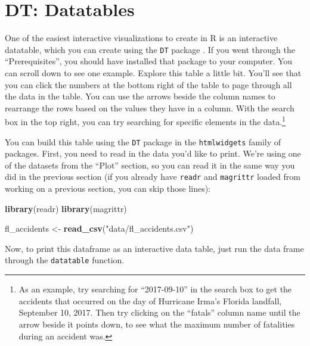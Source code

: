 \documentclass[]{tufte-book}
\newenvironment{Shaded}{}{}
\newcommand{\KeywordTok}[1]{\textcolor[rgb]{0.00,0.44,0.13}{\textbf{#1}}}
\newcommand{\NormalTok}[1]{#1}
\newcommand{\OperatorTok}[1]{\textcolor[rgb]{0.40,0.40,0.40}{#1}}
\newcommand{\StringTok}[1]{\textcolor[rgb]{0.25,0.44,0.63}{#1}}
\begin{document}
\hypertarget{dt-datatables}{%
\section{DT: Datatables}\label{dt-datatables}}

One of the easiest interactive visualizations to create in R is an interactive datatable,
which you can create using the \texttt{DT} package \citep{R-DT}.
If you went through the ``Prerequisites'', you should have installed that package to your
computer.
You can scroll down to see one example. Explore this table a little bit. You'll
see that you can click the numbers at the bottom right of the table to page through all
the data in the table. You can use the arrows beside the column names to rearrange
the rows based on the values they have in a column. With the search box in the top right,
you can try searching for specific elements in the data.\footnote{As an example, try searching for
  ``2017-09-10'' in the search box to get the accidents that occurred on the day of Hurricane
  Irma's Florida landfall, September 10, 2017. Then try clicking on the ``fatals'' column
  name until the arrow beside it points down, to see what the maximum number of fatalities
  during an accident was.}

You can build this table using the \texttt{DT} package in the \texttt{htmlwidgets} family of packages.
First, you need to read in the data you'd like to print. We're using one of the datasets
from the ``Plot'' section, so you can read it in the same way you did in the previous section
(if you already have \texttt{readr} and \texttt{magrittr} loaded from working on a previous section,
you can skip those lines):

\begin{Shaded}
\begin{Highlighting}[]
\KeywordTok{library}\NormalTok{(readr)}
\KeywordTok{library}\NormalTok{(magrittr)}

\NormalTok{fl_accidents <-}\StringTok{ }\KeywordTok{read_csv}\NormalTok{(}\StringTok{"data/fl_accidents.csv"}\NormalTok{)}
\end{Highlighting}
\end{Shaded}

Now, to print this dataframe as an interactive data table, just run the data frame through
the \texttt{datatable} function.

\begin{Shaded}
\end{Shaded}
\end{document}
